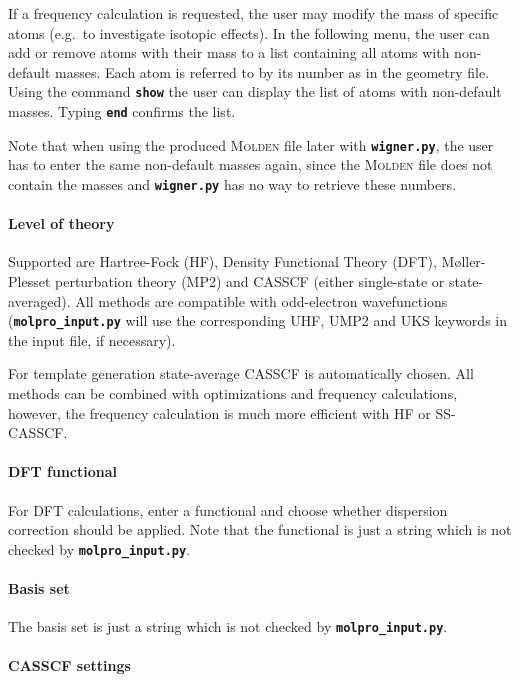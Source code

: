 \documentclass[a4paper,11pt,DIV=15,openany,twoside=false]{scrbook}
\newcommand{\ttt}[1]{\textbf{\texttt{#1}}}
\begin{document}
If a frequency calculation is requested, the user may modify the mass of specific atoms (e.g.\ to investigate isotopic effects). In the following menu, the user can add or remove atoms with their mass to a list containing all atoms with non-default masses. Each atom is referred to by its number as in the geometry file. Using the command \ttt{show} the user can display the list of atoms with non-default masses. Typing \ttt{end} confirms the list.

Note that when using the produced \textsc{Molden} file later with \ttt{wigner.py}, the user has to enter the same non-default masses again, since the \textsc{Molden} file does not contain the masses and \ttt{wigner.py} has no way to retrieve these numbers.

\paragraph{Level of theory}

Supported are Hartree-Fock (HF), Density Functional Theory (DFT), M{\o}ller-Plesset perturbation theory (MP2) and CASSCF (either single-state or state-averaged). All methods are compatible with odd-electron wavefunctions (\ttt{molpro\_input.py} will use the corresponding UHF, UMP2 and UKS keywords in the input file, if necessary).

For template generation state-average CASSCF is automatically chosen. All methods can be combined with optimizations and frequency calculations, however, the frequency calculation is much more efficient with HF or SS-CASSCF. 

\paragraph{DFT functional}

For DFT calculations, enter a functional and choose whether dispersion correction should be applied. Note that the functional is just a string which is not checked by \ttt{molpro\_input.py}. 

\paragraph{Basis set}

The basis set is just a string which is not checked by \ttt{molpro\_input.py}. 

\paragraph{CASSCF settings}
\end{document}
